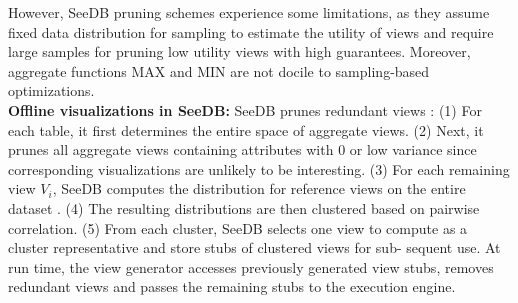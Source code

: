 {\begin{itemize}
\end{itemize}
 
 However, SeeDB pruning schemes experience some limitations, as they assume 
  fixed data distribution  \cite{DBLP:journals/pvldb/VartakMPP14,vartakseedb}  for sampling to estimate
  the utility of views and require large samples for pruning low utility views with high guarantees.
  Moreover, aggregate functions MAX and MIN are not docile to sampling-based 
  optimizations. \\
	
\noindent \textbf {Offline visualizations in SeeDB: }
SeeDB prunes redundant views \cite {DBLP:journals/pvldb/VartakMPP14} : (1) For each table, it first determines 
the entire space of aggregate views. (2) Next, it prunes all 
aggregate views containing attributes with 0 or low variance since corresponding 
visualizations are unlikely to be interesting. (3) For each remaining view $V_i$, SeeDB computes
 the distribution for reference views on the entire dataset . 
 (4) The resulting distributions are then clustered based on pairwise correlation. 
 (5) From each cluster, SeeDB selects one view to compute as a cluster representative and 
 store stubs of clustered views for sub- sequent use. At run time, the view generator accesses 
 previously generated view stubs, removes redundant views and passes the remaining stubs 
 to the execution engine. 
 }
